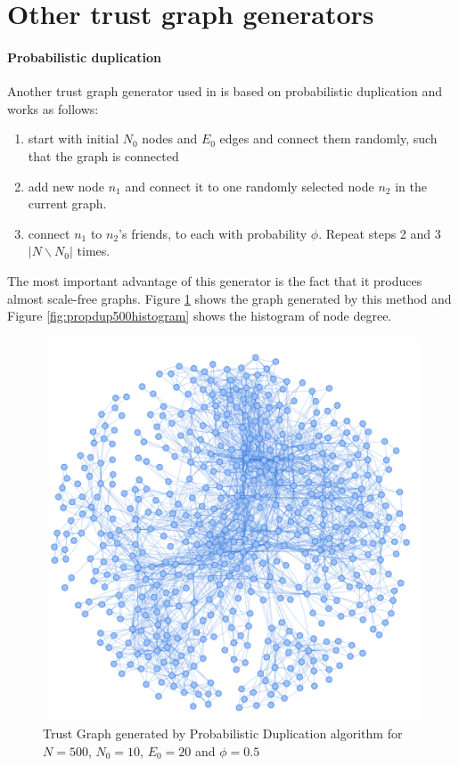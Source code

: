 \section{Other trust graph generators}

\paragraph{Probabilistic duplication}
Another trust graph generator used in \cite{konorski2019mitigating} is based on probabilistic duplication and works as follows:
\begin{enumerate}
    \item start with initial $N_0$ nodes and $E_0$ edges and connect them randomly, such that the graph is connected
    \item add new node $n_1$ and connect it to one randomly selected node $n_2$ in the current graph.
    \item connect $n_1$ to $n_2$'s friends, to each with probability $\phi$. Repeat steps 2 and 3 $|N \backslash N_0|$ times. 
\end{enumerate}

The most important advantage of this generator is the fact that it produces almost scale-free graphs. Figure \ref{fig:propdup500graph} shows the graph generated by this method and Figure \ref{fig:propdup500histogram} shows the histogram of node degree.

\begin{figure}[h!]
    \includegraphics[width=\textwidth]{img/propDup500Graph.png}
    \centering
    \caption{Trust Graph generated by Probabilistic Duplication algorithm for $N=500$, $N_0=10$, $E_0=20$ and $\phi = 0.5$}
    \label{fig:propdup500graph}
\end{figure}

